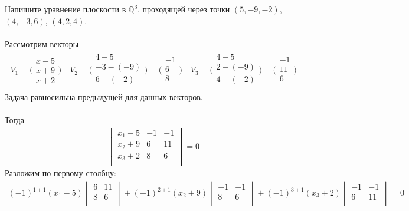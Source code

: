 		
		
		\subsection{}
		Напишите уравнение плоскости в $\mathbb{Q}^{3}$, проходящей через точки $(5, -9, -2)$, $(4, -3, 6)$, $(4, 2, 4)$.\\
		\\
		 Рассмотрим векторы 
		\begin{gather*}
		V_{1} = 
		\Bigg(\begin{array}{c}
			x - 5\\ x + 9\\ x + 2
		\end{array}\Bigg)
		\quad 
		V_{2} = 
		\Bigg(\begin{array}{c}
			4-5\\ -3- (-9)\\ 6- (-2)\\
		\end{array}\Bigg)
		= 
		\Bigg(\begin{array}{c}
			-1\\ 6\\ 8\\
		\end{array}\Bigg)
		\quad 
		V_{3} = 
		\Bigg(\begin{array}{c}
		4-5\\ 2- (-9)\\ 4- (-2)\\
		\end{array}\Bigg)
		= 
		\Bigg(\begin{array}{c}
			-1\\ 11\\ 6\\
		\end{array}\Bigg)
		\end{gather*}
		Задача равносильна предыдущей для данных векторов.\\
		\\
		Тогда 
		\begin{gather*}
			\begin{vmatrix}
				x_{1} - 5 & -1 & -1\\
				x_{2} + 9 & 6 & 11\\
				x_{3} + 2 & 8 & 6\\
			\end{vmatrix} = 0
		\end{gather*}
		Разложим по первому столбцу: 
		\begin{gather*}
		(-1)^{1 + 1} (x_{1} - 5) 
		\begin{vmatrix}
			6 & 11\\
			8 & 6\\
		\end{vmatrix} 
		+ (-1)^{2 + 1} (x_{2} + 9) 
		\begin{vmatrix}
			-1 & -1\\
			8 & 6\\
		\end{vmatrix} 
		+ (-1)^{3 + 1} (x_{3} + 2) 
		\begin{vmatrix}
			-1 & -1\\
			6 & 11\\
		\end{vmatrix}
		= 0
		\end{gather*}
